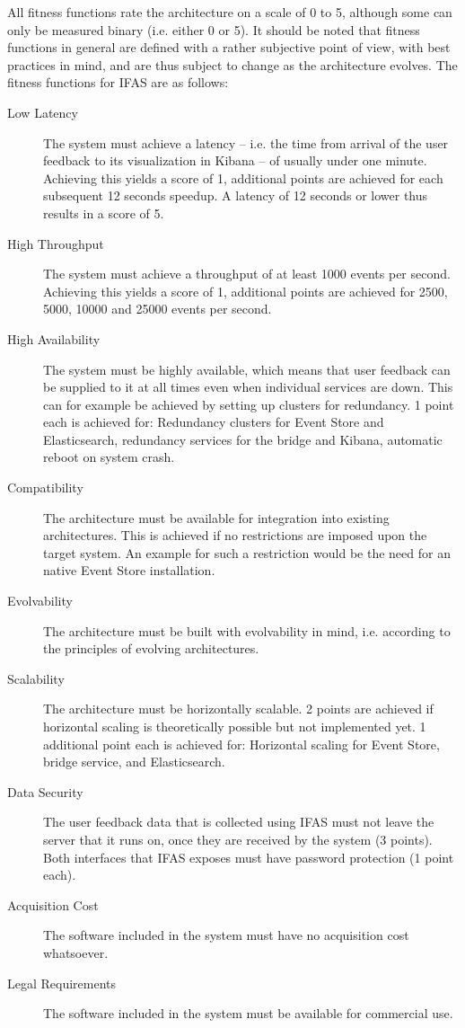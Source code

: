 All fitness functions rate the architecture on a scale of 0 to 5, although some can only be measured binary (i.e. either 0 or 5).
It should be noted that fitness functions in general are defined with a rather subjective point of view, with best practices in mind, and are thus subject to change as the architecture evolves.
The fitness functions for \ac{IFAS} are as follows:

\begin{description}
\item[Low Latency] The system must achieve a latency -- i.e. the time from arrival of the user feedback to its visualization in Kibana -- of usually under one minute.
Achieving this yields a score of 1, additional points are achieved for each subsequent 12 seconds speedup.
A latency of 12 seconds or lower thus results in a score of 5.
\item[High Throughput] The system must achieve a throughput of at least 1000 events per second.
Achieving this yields a score of 1, additional points are achieved for 2500, 5000, 10000 and 25000 events per second.
\item[High Availability] The system must be highly available, which means that user feedback can be supplied to it at all times even when individual services are down.
This can for example be achieved by setting up clusters for redundancy.
1 point each is achieved for: Redundancy clusters for Event Store and Elasticsearch, redundancy services for the bridge and Kibana, automatic reboot on system crash. 
\item[Compatibility] The architecture must be available for integration into existing architectures.
This is achieved if no restrictions are imposed upon the target system.
An example for such a restriction would be the need for an native Event Store installation.
\item[Evolvability] The architecture must be built with evolvability in mind, i.e. according to the principles of evolving architectures.
\item[Scalability] The architecture must be horizontally scalable.
2 points are achieved if horizontal scaling is theoretically possible but not implemented yet.
1 additional point each is achieved for: Horizontal scaling for Event Store, bridge service, and Elasticsearch.
\item[Data Security] The user feedback data that is collected using \ac{IFAS} must not leave the server that it runs on, once they are received by the system (3 points).
Both interfaces that \ac{IFAS} exposes must have password protection (1 point each).
\item[Acquisition Cost] The software included in the system must have no acquisition cost whatsoever.
\item[Legal Requirements] The software included in the system must be available for commercial use.
\end{description}


